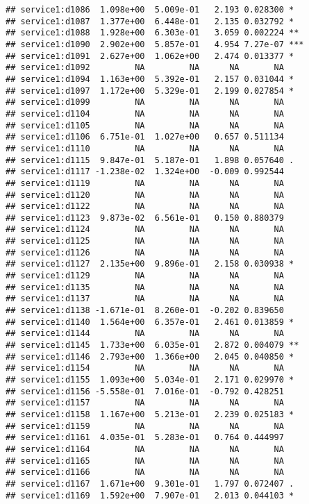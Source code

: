 \documentclass[
]{article}
\begin{document}
\begin{verbatim}
## service1:d1086  1.098e+00  5.009e-01   2.193 0.028300 *  
## service1:d1087  1.377e+00  6.448e-01   2.135 0.032792 *  
## service1:d1088  1.928e+00  6.303e-01   3.059 0.002224 ** 
## service1:d1090  2.902e+00  5.857e-01   4.954 7.27e-07 ***
## service1:d1091  2.627e+00  1.062e+00   2.474 0.013377 *  
## service1:d1092         NA         NA      NA       NA    
## service1:d1094  1.163e+00  5.392e-01   2.157 0.031044 *  
## service1:d1097  1.172e+00  5.329e-01   2.199 0.027854 *  
## service1:d1099         NA         NA      NA       NA    
## service1:d1104         NA         NA      NA       NA    
## service1:d1105         NA         NA      NA       NA    
## service1:d1106  6.751e-01  1.027e+00   0.657 0.511134    
## service1:d1110         NA         NA      NA       NA    
## service1:d1115  9.847e-01  5.187e-01   1.898 0.057640 .  
## service1:d1117 -1.238e-02  1.324e+00  -0.009 0.992544    
## service1:d1119         NA         NA      NA       NA    
## service1:d1120         NA         NA      NA       NA    
## service1:d1122         NA         NA      NA       NA    
## service1:d1123  9.873e-02  6.561e-01   0.150 0.880379    
## service1:d1124         NA         NA      NA       NA    
## service1:d1125         NA         NA      NA       NA    
## service1:d1126         NA         NA      NA       NA    
## service1:d1127  2.135e+00  9.896e-01   2.158 0.030938 *  
## service1:d1129         NA         NA      NA       NA    
## service1:d1135         NA         NA      NA       NA    
## service1:d1137         NA         NA      NA       NA    
## service1:d1138 -1.671e-01  8.260e-01  -0.202 0.839650    
## service1:d1140  1.564e+00  6.357e-01   2.461 0.013859 *  
## service1:d1144         NA         NA      NA       NA    
## service1:d1145  1.733e+00  6.035e-01   2.872 0.004079 ** 
## service1:d1146  2.793e+00  1.366e+00   2.045 0.040850 *  
## service1:d1154         NA         NA      NA       NA    
## service1:d1155  1.093e+00  5.034e-01   2.171 0.029970 *  
## service1:d1156 -5.558e-01  7.016e-01  -0.792 0.428251    
## service1:d1157         NA         NA      NA       NA    
## service1:d1158  1.167e+00  5.213e-01   2.239 0.025183 *  
## service1:d1159         NA         NA      NA       NA    
## service1:d1161  4.035e-01  5.283e-01   0.764 0.444997    
## service1:d1164         NA         NA      NA       NA    
## service1:d1165         NA         NA      NA       NA    
## service1:d1166         NA         NA      NA       NA    
## service1:d1167  1.671e+00  9.301e-01   1.797 0.072407 .  
## service1:d1169  1.592e+00  7.907e-01   2.013 0.044103 *  

\end{verbatim}
\end{document}
